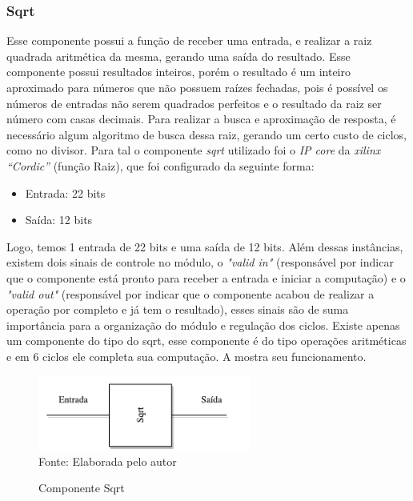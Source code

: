 \subsubsection{Sqrt}
Esse componente possui a função de receber uma entrada, e realizar a raiz quadrada aritmética da mesma, gerando uma saída do resultado. Esse componente possui resultados inteiros, porém o resultado é um inteiro aproximado para números que não possuem raízes fechadas, pois é possível os números de entradas não serem quadrados perfeitos e o resultado da raiz ser número com casas decimais. Para realizar a busca e aproximação de resposta, é necessário algum algoritmo de busca dessa raiz, gerando um certo custo de ciclos, como no divisor. Para tal o componente \textit{sqrt} utilizado foi o \textit{IP core} da \textit{xilinx “Cordic”} (função Raiz), que foi configurado da seguinte forma: 
\begin{itemize}
	\item Entrada: 22 bits
	\item Saída: 12 bits
\end{itemize}
Logo, temos 1 entrada de 22 bits e uma saída de 12 bits. Além dessas instâncias, existem dois sinais de controle no módulo, o \textit{"valid in"} (responsável por indicar que o componente está pronto para receber a entrada e iniciar a computação) e o \textit{"valid out"} (responsável por indicar que o componente acabou de realizar a operação por completo e já tem o resultado), esses sinais são de suma importância para a organização do módulo e regulação dos ciclos. Existe apenas um componente do tipo do sqrt, esse componente é do tipo operações aritméticas e em 6 ciclos ele completa sua computação. A  mostra seu funcionamento.

\begin{figure}[H]
	\centering
	\caption{Componente Sqrt}
	\includegraphics[width=7cm]{figures/sqrt.pdf}\\
	
	
	{Fonte: Elaborada pelo autor}
	\label{Sqrt}
\end{figure}

